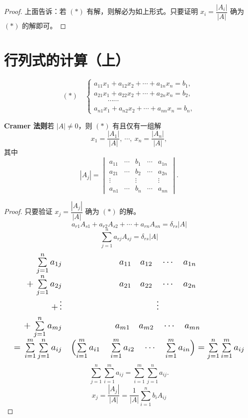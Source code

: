 \begin{proof}
上面告诉：若 $(*)$ 有解，则解必为如上形式。只要证明 $x_i=\dfrac{|A_i|}{|A|}$ 确为 $(*)$ 的解即可。\renewcommand{\qedsymbol}{}
\end{proof}

\section{行列式的计算（上）}%

\[
(*)\quad
\begin{cases}
a_{11}x_1+a_{12}x_2+\cdots+a_{1n}x_n=b_1,\\
a_{21}x_1+a_{22}x_2+\cdots+a_{2n}x_n=b_2,\\
\qquad\cdots\cdots\\
a_{n1}x_1+a_{n2}x_2+\cdots+a_{nn}x_n=b_n,
\end{cases}
\]

\textbf{Cramer 法则}\quad 若 $|A|\neq 0$，则 $(*)$ 有且仅有一组解
\[
x_1=\frac{|A_1|}{|A|},\ \cdots,\ x_n=\frac{|A_n|}{|A|},
\]
其中
\[
|A_j|=\begin{vmatrix}
a_{11} & \cdots & b_1 & \cdots & a_{1n}\\
a_{21} & \cdots & b_2 & \cdots & a_{2n}\\
\vdots & & \vdots & & \vdots\\
a_{n1} & \cdots & b_n & \cdots & a_{nn}
\end{vmatrix}.
\]

\begin{proof}
只要验证 $x_j=\dfrac{|A_j|}{|A|}$ 确为 $(*)$ 的解。
\[
a_{r1}A_{s1}+a_{r2}A_{s2}+\cdots+a_{rn}A_{sn}=\delta_{rs}|A|
\]
\[
\sum_{j=1}^{n}a_{rj}A_{sj}=\delta_{rs}|A|
\]
\[
\resizebox{\linewidth}{!}{$\displaystyle
\begin{array}{r@{\quad}c}
\sum\limits_{j=1}^{n}a_{1j} & a_{11}\quad a_{12}\quad\cdots\quad a_{1n}\\[4pt]
+\,\sum\limits_{j=1}^{n}a_{2j} & a_{21}\quad a_{22}\quad\cdots\quad a_{2n}\\[4pt]
+\,\vdots & \vdots\\[4pt]
+\,\sum\limits_{j=1}^{n}a_{mj} & a_{m1}\quad a_{m2}\quad\cdots\quad a_{mn}\\[4pt]
=\,\sum\limits_{i=1}^{m}\sum\limits_{j=1}^{n}a_{ij} &
\Bigl(\sum\limits_{i=1}^{m}a_{i1}\quad \sum\limits_{i=1}^{m}a_{i2}\quad\cdots\quad \sum\limits_{i=1}^{m}a_{in}\Bigr)=\sum\limits_{j=1}^{n}\sum\limits_{i=1}^{m}a_{ij}
\end{array}$}
\]
\[
\sum_{j=1}^{n}\sum_{i=1}^{m}a_{ij}=\sum_{i=1}^{m}\sum_{j=1}^{n}a_{ij}.
\]
\[
x_j=\frac{|A_j|}{|A|}=\frac{1}{|A|}\sum_{i=1}^{n}b_iA_{ij}
\]
\renewcommand{\qedsymbol}{}%
\end{proof}
